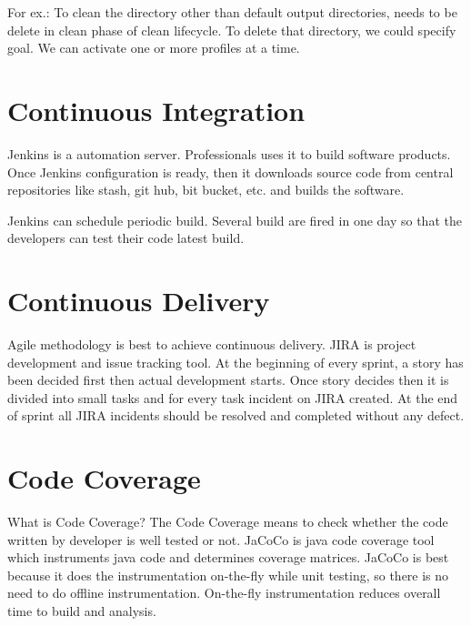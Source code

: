 \documentclass[a4paper,oneside,1,english1pt]{report}
\begin{document}
		For ex.: To clean the directory other than default output directories, needs to be delete in clean phase of clean lifecycle. To delete that directory, we could specify goal.
		We can activate one or more profiles at a time.
	\section{Continuous Integration}
		\par Jenkins is a automation server. Professionals uses it to build software products. Once  Jenkins configuration is ready, then it downloads source code from central repositories like stash, git hub, bit bucket, etc. and builds the software.
		\par Jenkins can schedule periodic build. Several build are fired in one day so that the developers can test their code latest build.
	\section{Continuous Delivery}
		Agile methodology is best to achieve continuous delivery. JIRA is project development and issue tracking tool. At the beginning of every sprint, a story has been decided first then actual development starts.  Once story  decides then it is divided into small tasks and for every task incident on JIRA created. At the end of sprint all JIRA incidents should be resolved and completed without any defect.
	\section{Code Coverage}
		What is Code Coverage? The Code Coverage means to check whether the code written by developer is well tested or not. JaCoCo is java code coverage tool which instruments java code and determines coverage matrices. JaCoCo is best because it does the instrumentation on-the-fly while unit testing, so there is no need to do offline instrumentation. On-the-fly instrumentation reduces overall time to build and analysis.
		\cite{jacoco-metrics}
\end{document}
